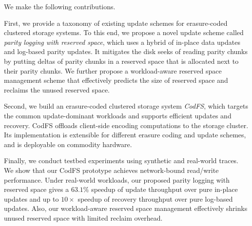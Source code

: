 We make the following contributions.

First, we provide a taxonomy of existing update schemes for
erasure-coded clustered storage systems.  To this end, we propose a novel
update scheme called {\em parity logging with reserved space}, which
uses a hybrid of in-place data updates and log-based parity updates.  It
mitigates the disk seeks of reading parity chunks by putting deltas of parity
chunks in a reserved space that is allocated next to their parity chunks.  We
further propose a workload-aware reserved space management scheme that
effectively predicts the size of reserved space and reclaims the unused
reserved space. 

Second, we build an erasure-coded clustered storage system {\em CodFS}, which
targets the common update-dominant workloads and supports efficient updates
and recovery.   CodFS offloads client-side encoding computations to the
storage cluster.  
Its implementation is extensible for different erasure coding and update
schemes, and is deployable on commodity hardware. 

Finally, we conduct testbed experiments using synthetic and real-world traces.
We show that our CodFS prototype achieves network-bound read/write
performance.  Under real-world workloads, our proposed parity logging with
reserved space gives a ${63.1}\%$ speedup of update throughput over pure
in-place updates and up to ${10\times}$ speedup of recovery throughput over
pure log-based updates.  Also, our workload-aware reserved space management
effectively shrinks unused reserved space with limited reclaim overhead. 




